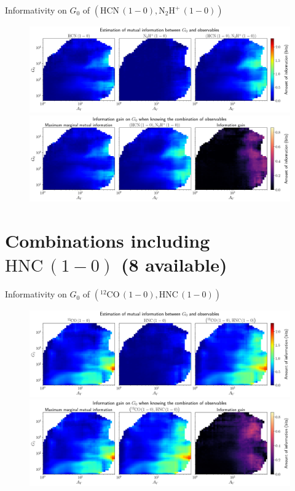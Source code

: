 \documentclass{beamer}
\begin{document}
\begin{frame}{Informativity on $G_0$ of $\left(\mathrm{HCN\,(1-0)},\mathrm{N_2H^+\,(1-0)}\right)$}
    \begin{figure}
        \centering
        \includegraphics[width=0.95\linewidth]{../mi/g0__hcn10_n2hp10_mi.png}
        \vfill
        \includegraphics[width=0.95\linewidth]{../mi/g0__hcn10_n2hp10_mi_gain.png}
    \end{figure}
\end{frame}

\section{Combinations including $\mathrm{HNC\,(1-0)}$ (8 available)}

\begin{frame}{Informativity on $G_0$ of $\left(\mathrm{^{12}CO\,(1-0)},\mathrm{HNC\,(1-0)}\right)$}
    \begin{figure}
        \centering
        \includegraphics[width=0.95\linewidth]{../mi/g0__12co10_hnc10_mi.png}
        \vfill
        \includegraphics[width=0.95\linewidth]{../mi/g0__12co10_hnc10_mi_gain.png}
    \end{figure}
\end{frame}
\end{document}
